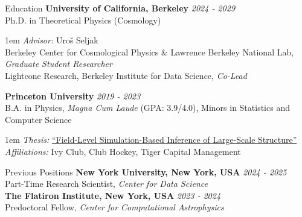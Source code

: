 \documentclass{resume}
\begin{document}
\begin{rSection}{Education}
{\bf University of California, Berkeley} \hfill {\em 2024 - 2029} \\
Ph.D. in Theoretical Physics (Cosmology)
\begin{addmargin}[1em]{1em}
\textit{Advisor:} Uro\v{s} Seljak\\
Berkeley Center for Cosmological Physics \& Lawrence Berkeley National Lab, \textit{Graduate Student Researcher}\\
Lightcone Research, Berkeley Institute for Data Science, \textit{Co-Lead}
\end{addmargin}
\medskip
{\bf Princeton University} \hfill {\em 2019 - 2023} \\
B.A. in Physics, \textit{Magna Cum Laude} (GPA: 3.9/4.0), Minors in Statistics and Computer Science
\begin{addmargin}[1em]{1em}
\textit{Thesis:} \href{https://journals.aps.org/prd/abstract/10.1103/PhysRevD.109.083536}{``Field-Level Simulation-Based Inference of Large-Scale Structure''}\\
\textit{Affiliations:} Ivy Club, Club Hockey, Tiger Capital Management
\end{addmargin}
\end{rSection}

\begin{rSection}{Previous Positions}
{\bf New York University, New York, USA} \hfill {\em 2024 - 2025} \\
Part-Time Research Scientist, \textit{Center for Data Science}
\\\newline
{\bf The Flatiron Institute, New York, USA} \hfill {\em 2023 - 2024} \\
Predoctoral Fellow, \textit{Center for Computational Astrophysics}
\end{rSection}
\end{document}
